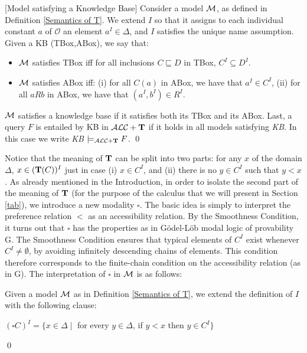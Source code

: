 \documentclass[a4paper, 11pt, oneside]{duthesis}
\newcommand{\tip}{{\bf T}}
\newcommand{\alct}{\mathcal{ALC}+\tip}
\newcommand{\vuoto} {\emptyset}
\newcommand{\tc} {\mid}
\newcommand{\appartiene} {\in}
\newcommand{\bbox}{\square}
\newcommand{\diverso} {\neq}
\newcommand{\emme} {\begin{mathcal}M\end{mathcal}}
\newenvironment{definition}
{\begin{defi} \rm}{\qed \end{defi}}
\newenvironment{definition}
{\begin{defi} \rm}{\qed \end{defi}}
\newtheorem{definition}{Definition}
\newcounter{posu}
\newtheorem{definition}[posu]{Definition}
\begin{document}
\begin{definition}[Model satisfying a Knowledge Base]\label{Def-ModelSatTBox-ABox} Consider a model $\emme$, as defined in Definition \ref{Semantics of T}.
We extend $I$ so that it assigns to each individual constant $a$ of $\mathcal{O}$ an element $a^I \in \Delta$,  and $I$ satisfies the unique name assumption. Given a KB (TBox,ABox), we say that:

\begin{itemize}
\item $\emme$  satisfies TBox iff  for all  inclusions $C \sqsubseteq D$  in TBox, $C^I \subseteq D^I$.
\item $\emme$ satisfies ABox  iff:
(i) for all $C(a)$  in ABox, we have that $a^I \in C^I$,
(ii) for all $aRb$ in ABox, we have that $(a^I,b^I) \in R^I$.
\end{itemize}

\noindent $\emme$ satisfies a knowledge base if it satisfies both its TBox and its ABox.
Last, a query $F$  is  entailed by KB in $\alct$ if it holds in all models satisfying \emph{KB}.
In this case we write \emph{KB} $\models_{\alct} F$.
\end{definition}


\noindent Notice that the meaning of $\tip$ can be split into two parts: for any $x$ of the domain $\Delta$,  $x \in (\tip(C))^I$ just in case (i) $x \in C^I$, and (ii) there is no $y \in C^I$ such that $y < x$.
As already mentioned in the Introduction, in order to isolate the second part of the meaning of $\tip$ (for the purpose of the calculus that we will present in Section \ref{tab}), we introduce a new modality $\bbox$.
The basic idea is simply to interpret the preference relation $<$ as an accessibility relation.
By the Smoothness Condition, it turns out that $\bbox$ has the properties as in G\"odel-L\"ob modal logic of provability G.
The Smoothness Condition ensures that typical elements of $C^I$ exist whenever $C^I \diverso \vuoto$, by avoiding infinitely descending chains of elements.
This condition therefore corresponds to the finite-chain condition on the accessibility relation (as in G).
The interpretation of $\bbox$ in $\emme$ is as follows:

\begin{definition}\label{def-box}
Given a model $\emme$ as in Definition \ref{Semantics of T}, we extend the definition of $I$ with the following clause:
\begin{center}
	$(\bbox C)^I = \{x \in \Delta \tc $  for every $y \appartiene \Delta$, if $y < x$ then $y \in C^I \}$
\end{center}
\end{definition}
\end{document}
